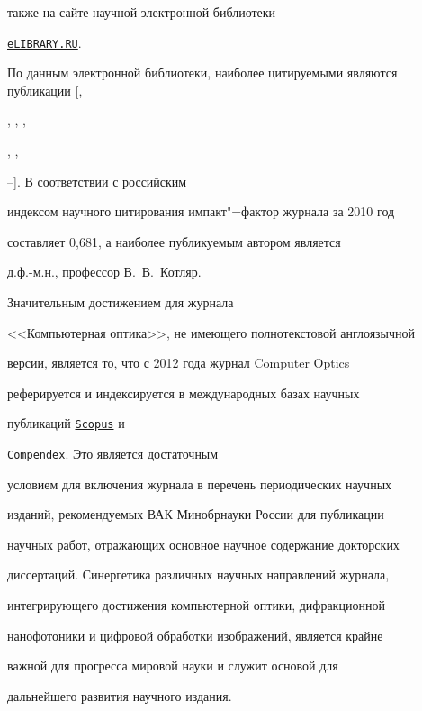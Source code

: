 также на сайте научной электронной библиотеки

\href{http://elibrary.ru/title_about.asp?id=8779}{\tt eLIBRARY.RU}. 

По данным электронной библиотеки, наиболее цитируемыми являются публикации [,

, , ,

, ,

--]. В соответствии с российским

индексом научного цитирования импакт"=фактор журнала за 2010 год

составляет 0,681, а наиболее публикуемым автором является

д.ф.-м.н., профессор В.~В.~Котляр.



\smallskip



 Значительным достижением для журнала

<<Компьютерная оптика>>, не имеющего полнотекстовой англоязычной

версии, является то, что с 2012 года журнал Computer Optics

реферируется и индексируется в международных базах научных

публикаций \href{http://www.scopus.com/source/sourceInfo.url?sourceId=21100203110}{\tt Scopus} и 

\href{http://www.ei.org/compendex/}{\tt Compendex}. Это является достаточным

условием для включения журнала в перечень периодических научных

изданий, рекомендуемых ВАК Минобрнауки России для публикации

научных работ, отражающих основное научное содержание докторских

диссертаций. Синергетика различных научных направлений журнала,

интегрирующего достижения компьютерной оптики, дифракционной

нанофотоники и цифровой обработки изображений, является крайне

важной для прогресса мировой науки и служит основой для

дальнейшего развития научного издания.



\newpage



